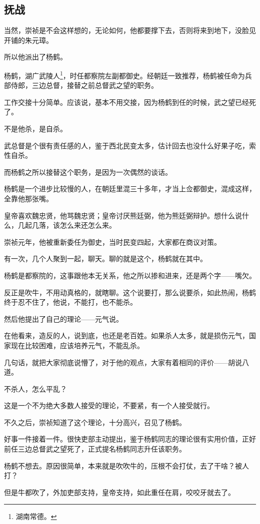 \begin{multicols}{\theparacolNo}
		\subsection{抚战}
		当然，崇祯是不会这样想的，无论如何，他都要撑下去，否则将来到地下，没脸见开铺的朱元璋。

		所以他派出了杨鹤。

		杨鹤，湖广武陵人\footnote{湖南常德。}，时任都察院左副都御史。经朝廷一致推荐，杨鹤被任命为兵部侍郎，三边总督，接替之前总督武之望的职务。

		工作交接十分简单。应该说，基本不用交接，因为杨鹤到任的时候，武之望已经死了。

		不是他杀，是自杀。

		武总督是个很有责任感的人，鉴于西北民变太多，估计回去也没什么好果子吃，索性自杀。

		而杨鹤之所以接替这个职务，是因为一次偶然的谈话。

		杨鹤是一个进步比较慢的人，在朝廷里混三十多年，才当上佥都御史，混成这样，全靠他那张嘴。

		皇帝喜欢魏忠贤，他骂魏忠贤；皇帝讨厌熊廷弼，他为熊廷弼辩护。想什么说什么，几起几落，该怎么来还怎么来。

		崇祯元年，他被重新委任为御史，当时民变四起，大家都在商议对策。

		有一次，几个人聚到一起，聊天。聊的就是这个，杨鹤就在其中。

		杨鹤是都察院的，这事跟他本无关系，他之所以掺和进来，还是两个字——嘴欠。

		反正是吹牛，不用动真格的，就瞎聊。这个说要打，那么说要杀，如此热闹，杨鹤终于忍不住了，他说，不能打，也不能杀。

		然后他提出了自己的理论——元气说。

		在他看来，造反的人，说到底，也还是老百姓。如果杀人太多，就是损伤元气，国家现在比较困难，应该培养元气，不能乱杀。

		几句话，就把大家彻底说懵了，对于他的观点，大家有着相同的评价——胡说八道。

		不杀人，怎么平乱？

		这是一个不为绝大多数人接受的理论，不要紧，有一个人接受就行。

		不久之后，崇祯知道了这个理论，十分高兴，召见了杨鹤。

		好事一件接着一件。很快吏部主动提出，鉴于杨鹤同志的理论很有实用价值，正好前任三边总督武之望死了，正式提名杨鹤同志升任该职务。

		杨鹤不想去。原因很简单，本来就是吹吹牛的，压根不会打仗，去了干啥？被人打？

		但是牛都吹了，外加吏部支持，皇帝支持，如此重任在肩，咬咬牙就去了。


\end{multicols}
